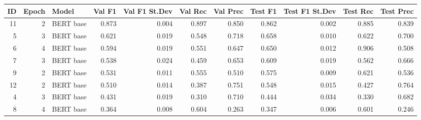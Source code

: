 \begin{tabular}{rrlrrrrrrrr}
\toprule
 ID &  Epoch &     Model &  Val F1 &  Val F1 St.Dev &  Val Rec &  Val Prec &  Test F1 &  Test F1 St.Dev &  Test Rec &  Test Prec \\
\midrule
 11 &      2 & BERT base &   0.873 &          0.004 &    0.897 &     0.850 &    0.862 &           0.002 &     0.885 &      0.839 \\
  5 &      3 & BERT base &   0.621 &          0.019 &    0.548 &     0.718 &    0.658 &           0.010 &     0.622 &      0.700 \\
  6 &      4 & BERT base &   0.594 &          0.019 &    0.551 &     0.647 &    0.650 &           0.012 &     0.906 &      0.508 \\
  7 &      3 & BERT base &   0.538 &          0.024 &    0.459 &     0.653 &    0.609 &           0.019 &     0.562 &      0.666 \\
  9 &      2 & BERT base &   0.531 &          0.011 &    0.555 &     0.510 &    0.575 &           0.009 &     0.621 &      0.536 \\
 12 &      2 & BERT base &   0.510 &          0.014 &    0.387 &     0.751 &    0.548 &           0.015 &     0.427 &      0.764 \\
  4 &      3 & BERT base &   0.431 &          0.019 &    0.310 &     0.710 &    0.444 &           0.034 &     0.330 &      0.682 \\
  8 &      4 & BERT base &   0.364 &          0.008 &    0.604 &     0.263 &    0.347 &           0.006 &     0.601 &      0.246 \\
\bottomrule
\end{tabular}

